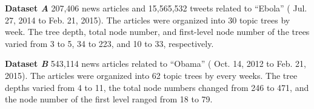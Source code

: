\begin{compactitem}
\item \textbf{\normalsize Dataset \emph{A}}  207,406 news articles and 15,565,532 tweets related to ``Ebola'' ( Jul. 27, 2014 to Feb. 21, 2015).
The articles were organized into 30 topic trees by week.
The tree depth, total node number, and first-level node number of the trees varied from 3 to 5, 34 to 223, and 10 to 33, respectively.
\item \textbf{\normalsize Dataset \emph{B}}  543,114 news articles related to ``Obama''  ( Oct. 14, 2012 to Feb. 21, 2015).
The articles were organized into 62 topic trees by every  weeks.
The tree depths varied from 4 to 11, the total node numbers changed from 246 to 471, and the node number of the first level ranged from 18 to 79.
\end{compactitem}





